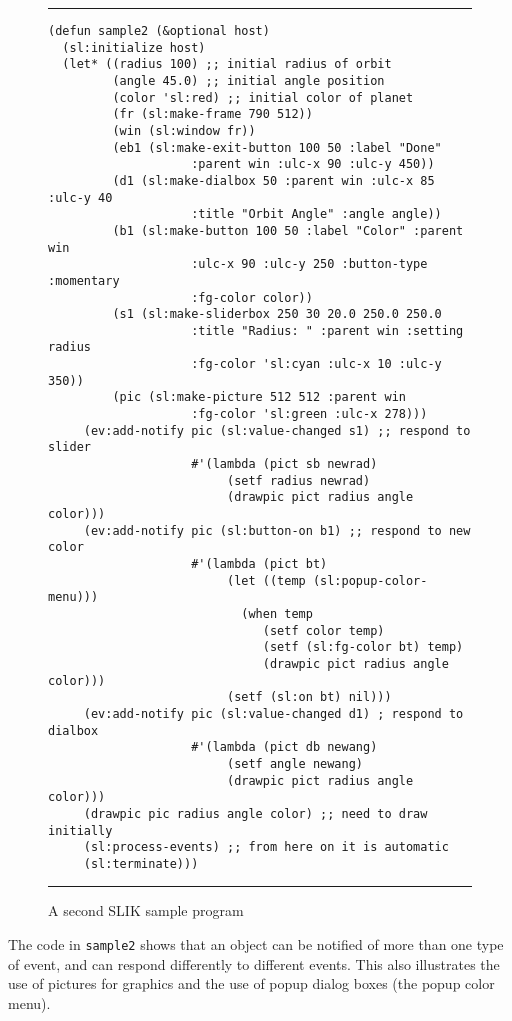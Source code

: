 \documentclass[twoside,openright,11pt]{report}
\newcommand{\tp}[1]{\texttt{#1}}
\begin{document}
\begin{figure}[htb]

\rule{\textwidth}{1mm}

\begin{verbatim}
(defun sample2 (&optional host)
  (sl:initialize host)
  (let* ((radius 100) ;; initial radius of orbit
         (angle 45.0) ;; initial angle position
         (color 'sl:red) ;; initial color of planet
         (fr (sl:make-frame 790 512))
         (win (sl:window fr))
         (eb1 (sl:make-exit-button 100 50 :label "Done"
                    :parent win :ulc-x 90 :ulc-y 450))
         (d1 (sl:make-dialbox 50 :parent win :ulc-x 85 :ulc-y 40
                    :title "Orbit Angle" :angle angle))
         (b1 (sl:make-button 100 50 :label "Color" :parent win
                    :ulc-x 90 :ulc-y 250 :button-type :momentary
                    :fg-color color))
         (s1 (sl:make-sliderbox 250 30 20.0 250.0 250.0
                    :title "Radius: " :parent win :setting radius
                    :fg-color 'sl:cyan :ulc-x 10 :ulc-y 350))
         (pic (sl:make-picture 512 512 :parent win
                    :fg-color 'sl:green :ulc-x 278)))
     (ev:add-notify pic (sl:value-changed s1) ;; respond to slider
                    #'(lambda (pict sb newrad)
                         (setf radius newrad)
                         (drawpic pict radius angle color)))
     (ev:add-notify pic (sl:button-on b1) ;; respond to new color
                    #'(lambda (pict bt)
                         (let ((temp (sl:popup-color-menu)))
                           (when temp
                              (setf color temp)
                              (setf (sl:fg-color bt) temp)
                              (drawpic pict radius angle color)))
                         (setf (sl:on bt) nil)))
     (ev:add-notify pic (sl:value-changed d1) ; respond to dialbox
                    #'(lambda (pict db newang)
                         (setf angle newang)
                         (drawpic pict radius angle color)))
     (drawpic pic radius angle color) ;; need to draw initially
     (sl:process-events) ;; from here on it is automatic
     (sl:terminate)))
\end{verbatim}

\rule{\textwidth}{1mm}

\caption{A second SLIK sample program} \label{fig:sample2}
\end{figure}

The code in \tp{sample2} shows that an object can be notified of more
than one type of event, and can respond differently to different
events.  This also illustrates the use of pictures for graphics and
the use of popup dialog boxes (the popup color menu).
\end{document}
